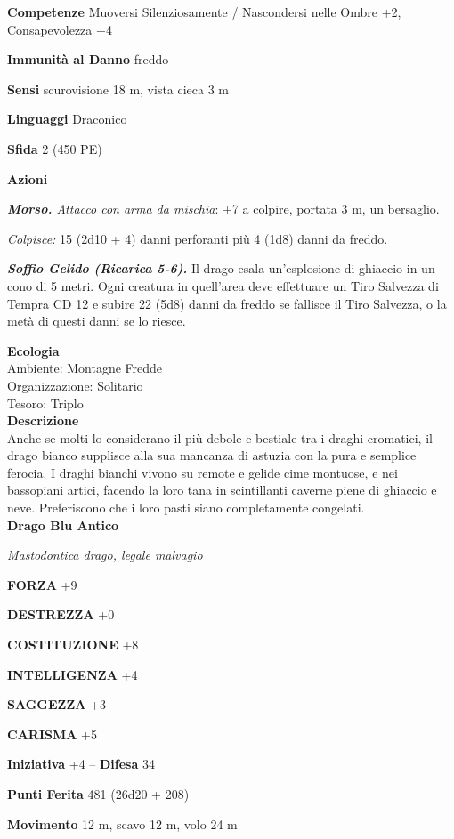 \begin{multicols}{2}
\textbf{Competenze} Muoversi Silenziosamente / Nascondersi nelle Ombre +2, Consapevolezza +4

\textbf{Immunità al Danno} freddo

\textbf{Sensi} scurovisione 18 m, vista cieca 3 m

\textbf{Linguaggi} Draconico

\textbf{Sfida} 2 (450 PE)

\textbf{Azioni}

\emph{\textbf{Morso.} Attacco con arma da mischia}: +7 a colpire, portata 3 m, un bersaglio.

\emph{Colpisce:} 15 (2d10 + 4) danni perforanti più 4 (1d8) danni da freddo.

\emph{\textbf{Soffio Gelido (Ricarica 5-6).}} Il drago esala un'esplosione di ghiaccio in un cono di 5 metri. Ogni creatura in quell'area deve effettuare un Tiro Salvezza di Tempra CD 12 e subire 22 (5d8) danni da freddo se fallisce il Tiro Salvezza, o la metà di questi danni se lo riesce.

\textbf{Ecologia}\\
Ambiente: Montagne Fredde\\
Organizzazione: Solitario\\
Tesoro: Triplo\\
\textbf{Descrizione}\\
Anche se molti lo considerano il più debole e bestiale tra i draghi cromatici, il drago bianco supplisce alla sua mancanza di astuzia con la pura e semplice ferocia. I draghi bianchi vivono su remote e gelide cime montuose, e nei bassopiani artici, facendo la loro tana in scintillanti caverne piene di ghiaccio e neve. Preferiscono che i loro pasti siano completamente congelati.\\


\medskip{}\textbf{Drago Blu Antico}

\emph{Mastodontica drago, legale malvagio}

\textbf{FORZA} +9

\textbf{DESTREZZA} +0

\textbf{COSTITUZIONE} +8

\textbf{INTELLIGENZA} +4

\textbf{SAGGEZZA} +3

\textbf{CARISMA} +5

\textbf{Iniziativa} +4 -- \textbf{Difesa} 34

\textbf{Punti Ferita} 481 (26d20 + 208)

\textbf{Movimento} 12 m, scavo 12 m, volo 24 m


\end{multicols}
